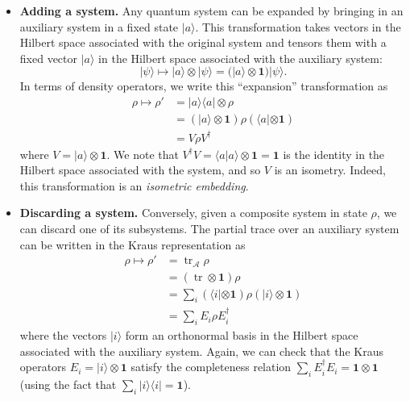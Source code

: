 \documentclass[fleqn,a4paper]{article}
\theoremstyle{definition}
\theoremstyle{definition}
\theoremstyle{definition}
\theoremstyle{definition}
\theoremstyle{remark}
\begin{document}
\begin{itemize}
\item
  \textbf{Adding a system.}
  Any quantum system can be expanded by bringing in an auxiliary system in a fixed state \(|a\rangle\).
  This transformation takes vectors in the Hilbert space associated with the original system and tensors them with a fixed vector \(|a\rangle\) in the Hilbert space associated with the auxiliary system:
  \[
      |\psi\rangle
      \longmapsto |a\rangle\otimes|\psi\rangle
      = (|a\rangle\otimes\mathbf{1}) |\psi\rangle.
    \]
  In terms of density operators, we write this ``expansion'' transformation as
  \[
      \begin{aligned}
        \rho
        \longmapsto \rho'
        &= |a\rangle\langle a|\otimes\rho
      \\&= (|a\rangle\otimes\mathbf{1})\rho (\langle a|\otimes\mathbf{1})
      \\&= V\rho V^\dagger
      \end{aligned}
    \]
  where \(V=|a\rangle\otimes\mathbf{1}\).
  We note that \(V^\dagger V=\langle a|a\rangle\otimes\mathbf{1}=\mathbf{1}\) is the identity in the Hilbert space associated with the system, and so \(V\) is an isometry.
  Indeed, this transformation is an \emph{isometric embedding}.
\item
  \textbf{Discarding a system.}
  Conversely, given a composite system in state \(\rho\), we can discard one of its subsystems.
  The partial trace over an auxiliary system can be written in the Kraus representation as
  \[
      \begin{aligned}
        \rho
        \longmapsto \rho'
        &= \operatorname{tr}_\mathcal{A}\rho
      \\&= (\operatorname{tr}\otimes\mathbf{1})\rho
      \\&= \sum_i (\langle i|\otimes\mathbf{1})\rho(|i\rangle\otimes\mathbf{1})
      \\&= \sum_i E_i\rho E^\dagger_i
      \end{aligned}
    \]
  where the vectors \(|i\rangle\) form an orthonormal basis in the Hilbert space associated with the auxiliary system.
  Again, we can check that the Kraus operators \(E_i=|i\rangle\otimes\mathbf{1}\) satisfy the completeness relation \(\sum_i E^\dagger_i E_i =\mathbf{1}\otimes\mathbf{1}\) (using the fact that \(\sum_i|i\rangle\langle i|=\mathbf{1}\)).
\end{itemize}
\end{document}
